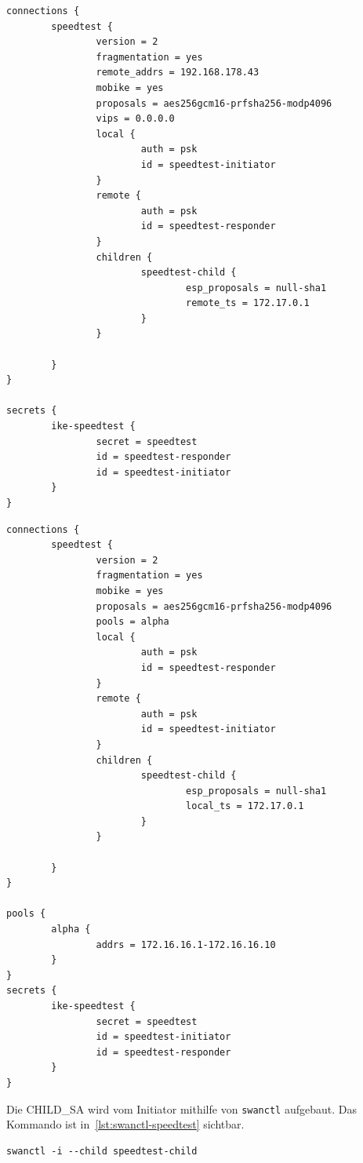 \begin{lstlisting}[label=lst:speedtest-initiator-config,caption=Initiator-Konfiguration für den Geschwindigkeitstest]
connections {
        speedtest {
                version = 2
                fragmentation = yes
                remote_addrs = 192.168.178.43
                mobike = yes
                proposals = aes256gcm16-prfsha256-modp4096
                vips = 0.0.0.0
                local {
                        auth = psk
                        id = speedtest-initiator
                }
                remote {
                        auth = psk
                        id = speedtest-responder
                }
                children {
                        speedtest-child {
                                esp_proposals = null-sha1
                                remote_ts = 172.17.0.1
                        }
                }

        }
}

secrets {
        ike-speedtest {
                secret = speedtest
                id = speedtest-responder
                id = speedtest-initiator
        }
}
\end{lstlisting}
\begin{lstlisting}[label=lst:speedtest-responder-config,caption=Responder-Konfiguration für den Geschwindigkeitstest]
connections {
        speedtest {
                version = 2
                fragmentation = yes
                mobike = yes
                proposals = aes256gcm16-prfsha256-modp4096
                pools = alpha
                local {
                        auth = psk
                        id = speedtest-responder
                }
                remote {
                        auth = psk
                        id = speedtest-initiator
                }
                children {
                        speedtest-child {
                                esp_proposals = null-sha1
                                local_ts = 172.17.0.1
                        }
                }
                
        }
}

pools {
        alpha {
                addrs = 172.16.16.1-172.16.16.10
        }
}
secrets {
        ike-speedtest {
                secret = speedtest
                id = speedtest-initiator
                id = speedtest-responder
        }
}
\end{lstlisting}

Die CHILD\_SA wird vom Initiator mithilfe von \texttt{swanctl} aufgebaut. Das Kommando
ist in~\autoref{lst:swanctl-speedtest} sichtbar.
\begin{lstlisting}[label=lst:swanctl-speedtest,caption=Kommando für den Tunnelaufbau des Geschwindigkeitstests]
swanctl -i --child speedtest-child
\end{lstlisting}

